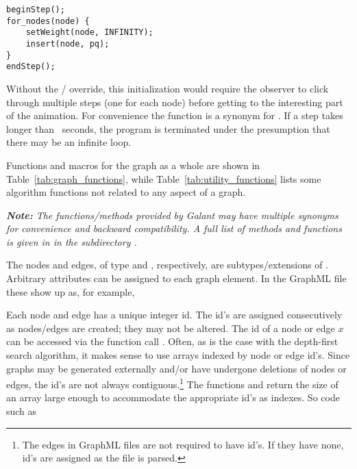 \begin{center}
\begin{minipage}{0.5\textwidth}
\begin{verbatim}
beginStep();
for_nodes(node) {
    setWeight(node, INFINITY);
    insert(node, pq);
}
endStep();
\end{verbatim}
\end{minipage}
\end{center}

Without the /
override, this initialization would require the observer to click
through multiple steps (one for each node) before getting to the interesting
part of the animation.
For convenience the function  is a synonym for .
If a step takes longer than \Timeout\ seconds, the program is terminated
under the presumption that there may be an infinite loop.





Functions and macros for the graph as a whole are shown in Table~\ref{tab:graph_functions}, while Table~\ref{tab:utility_functions} lists some algorithm functions not related to any aspect of a graph.

\emph{\textbf{Note:} The functions/methods provided by Galant may have multiple synonyms for
convenience and backward compatibility. A full list of methods and functions
is given in  in the subdirectory
.}

The nodes and edges, of type  and , respectively,
are subtypes/extensions of .
Arbitrary attributes can be assigned to each graph element. In the GraphML file
these show up as, for example,\\
\hspace*{3em}

Each node and edge has a unique integer id.
The id's are assigned consecutively as nodes/edges are created;
they may not be altered.
The id of a node or edge $x$ can be accessed via the function call .
Often, as is the case with the depth-first search algorithm, it makes sense to use
arrays indexed by node or edge id's.
Since graphs may be generated externally and/or have undergone deletions of nodes or
edges, the id's are not always contiguous.\footnote{
  The edges in GraphML files are not required to have id's. If they have
  none, id's are assigned as the file is parsed.
}
The functions  and  return the size of an array
large enough to accommodate the appropriate id's as indexes. So code such as

